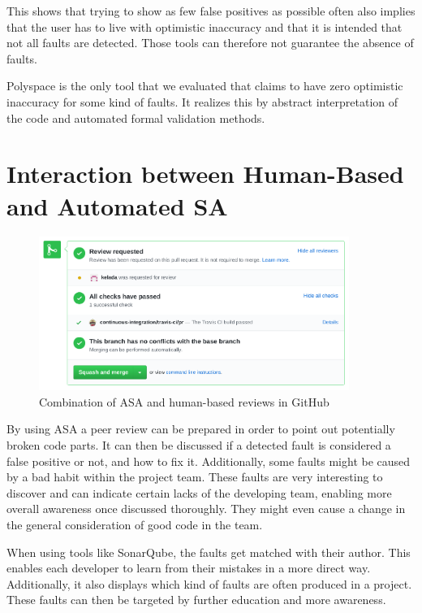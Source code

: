 \documentclass{scrreprt}
\begin{document}
This shows that trying to show as few false positives as possible often also implies that the user has to live with optimistic inaccuracy and that it is intended that not all faults are detected. Those tools can therefore not guarantee the absence of faults.

Polyspace is the only tool that we evaluated that claims to have zero optimistic inaccuracy for some kind of faults. It realizes this by abstract interpretation of the code and automated formal validation methods.

\section{Interaction between Human-Based and Automated SA}
\label{sec:humand-based-vs-automated-sa}

\begin{figure}[h]
	\centering
	\includegraphics[width=0.9\textwidth]{img/github_pr_review}
	\caption[GitHub PR review]{Combination of ASA and human-based reviews in GitHub}
	\label{fig:github_pr_review}
\end{figure}

By using ASA a peer review can be prepared in order to point out potentially broken code parts. It can then be discussed if a detected fault is considered a false positive or not, and how to fix it. Additionally, some faults might be caused by a bad habit within the project team. These faults are very interesting to discover and can indicate certain lacks of the developing team, enabling more overall awareness once discussed thoroughly. They might even cause a change in the general consideration of good code in the team.  

When using tools like SonarQube, the faults get matched with their author. This enables each developer to learn from their mistakes in a more direct way. Additionally, it also displays which kind of faults are often produced in a project. These faults can then be targeted by further education and more awareness.
\end{document}
